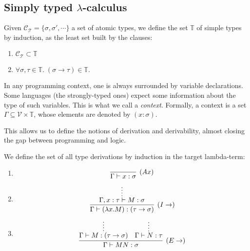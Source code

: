 \subsection{Simply typed $\lambda$-calculus}

\begin{mydef}[Type]
Given $\mathcal{C}_{\mathcal{T}} = \{ \sigma, \sigma', \cdots \}$ a set of atomic types,
we define the set $\mathbb{T}$ of simple types by induction, as the least set built by the clauses:
\begin{enumerate} %
  \item $\mathcal{C}_{\mathcal{T}} \subset \mathbb{T}$
  \item $\forall \sigma, \tau \in \mathbb{T}. \; (\sigma \rightarrow \tau) \in \mathbb{T}$.
\end{enumerate}
\end{mydef}

In any programming context, one is always surrounded by variable declarations. Some languages (the strongly-typed ones)
expect some information about the type of such variables. This is what we call a \emph{context}.
Formally, a context is a set $\Gamma \subseteq \mathcal{V} \times \mathbb{T}$, whose elements
are denoted by $(x : \sigma)$.

This allows us to define the notions of derivation and derivability, almost closing the
gap between programming and logic.\\

\begin{mydef}[Derivation]
\label{def:simpletypederivation}
We define the set of all type derivations by induction in the target lambda-term:
\begin{enumerate} %
  \item
    \[\vcenter{\infer[(Ax)]{\Gamma \vdash x:\sigma}{}} \]
    
  \item 
    \[\vcenter{\infer[(I\rightarrow)]{\Gamma \vdash (\lambda x.M) : (\tau \rightarrow \sigma)}
							{\infer*{\Gamma, x:\tau \vdash M:\sigma}{}}} \]

  \item 
    \[\vcenter{
			\infer[(E\rightarrow)]
				{\Gamma \vdash MN : \sigma}
				{
					\infer*
						{\Gamma \vdash M:(\tau \rightarrow \sigma)}
						{}
				&
					\infer*
						{\Gamma \vdash N:\tau}
						{}
				}
		
		}\]
\end{enumerate}
\end{mydef}

